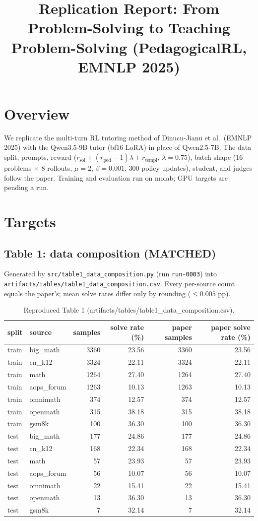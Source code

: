 \documentclass{article}
\title{Replication Report: From Problem-Solving to Teaching Problem-Solving (PedagogicalRL, EMNLP 2025)}
\author{}
\date{}
\begin{document}
\maketitle

\section{Overview}
We replicate the multi-turn RL tutoring method of Dinucu-Jianu et al.\ (EMNLP 2025) with the Qwen3.5-9B tutor
(bf16 LoRA) in place of Qwen2.5-7B. The data split, prompts, reward ($r_{\text{sol}} + (r_{\text{ped}}-1)\lambda + r_{\text{templ}}$, $\lambda=0.75$),
batch shape (16 problems $\times$ 8 rollouts, $\mu=2$, $\beta=0.001$, 300 policy updates), student, and judges follow the paper.
Training and evaluation run on molab; GPU targets are pending a run.

\section{Targets}

\subsection{Table 1: data composition (MATCHED)}
Generated by \texttt{src/table1\_data\_composition.py} (run \texttt{run-0003}) into
\texttt{artifacts/tables/table1\_data\_composition.csv}. Every per-source count equals the paper's; mean
solve rates differ only by rounding ($\le 0.005$ pp).
\begin{table}[H]
\centering
\begin{tabular}{llrrrr}
\toprule
split & source & samples & solve rate (\%) & paper samples & paper solve rate (\%) \\
\midrule
train & big\_math & 3360 & 23.56 & 3360 & 23.56 \\
train & cn\_k12 & 3324 & 22.11 & 3324 & 22.11 \\
train & math & 1264 & 27.40 & 1264 & 27.40 \\
train & aops\_forum & 1263 & 10.13 & 1263 & 10.13 \\
train & omnimath & 374 & 12.57 & 374 & 12.57 \\
train & openmath & 315 & 38.18 & 315 & 38.18 \\
train & gsm8k & 100 & 36.30 & 100 & 36.30 \\
test & big\_math & 177 & 24.86 & 177 & 24.86 \\
test & cn\_k12 & 168 & 22.34 & 168 & 22.34 \\
test & math & 57 & 23.93 & 57 & 23.93 \\
test & aops\_forum & 56 & 10.07 & 56 & 10.07 \\
test & omnimath & 22 & 15.41 & 22 & 15.41 \\
test & openmath & 13 & 36.30 & 13 & 36.30 \\
test & gsm8k & 7 & 32.14 & 7 & 32.14 \\
\bottomrule
\end{tabular}
\caption{Reproduced Table 1 (artifacts/tables/table1\_data\_composition.csv).}
\label{tab:table1}
\end{table}
\end{document}

